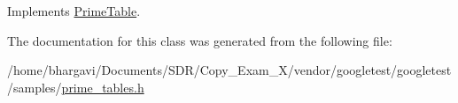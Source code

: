 Implements \hyperlink{class_prime_table_a2ab9243364ded0c51541f641b2df362a}{Prime\+Table}.



The documentation for this class was generated from the following file\+:\begin{DoxyCompactItemize}
\item 
/home/bhargavi/\+Documents/\+S\+D\+R/\+Copy\+\_\+\+Exam\+\_\+X/vendor/googletest/googletest/samples/\hyperlink{prime__tables_8h}{prime\+\_\+tables.\+h}\end{DoxyCompactItemize}
